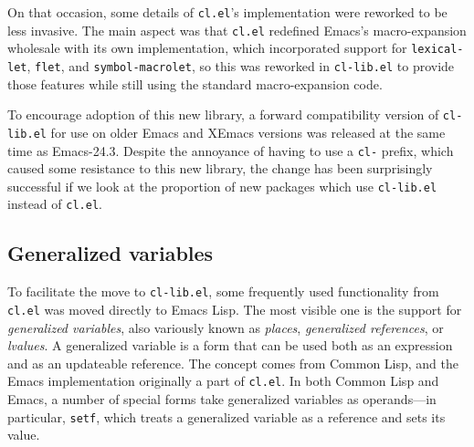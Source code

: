 \documentclass[format=acmsmall, review]{acmart}
\newcommand \Elisp {Emacs Lisp}
\begin{document}
On that occasion, some details of \texttt{cl.el}'s implementation were
reworked to be less invasive.  The main aspect was that \texttt{cl.el}
redefined Emacs's macro-expansion wholesale with its own implementation,
which incorporated support for \texttt{lexical-let}, \texttt{flet}, and
\texttt{symbol-macrolet}, so this was reworked in \texttt{cl-lib.el} to
provide those features while still using the standard macro-expansion code.

To encourage adoption of this new library, a forward compatibility version
of \texttt{cl-lib.el} for use on older Emacs and XEmacs versions was
released at the same time as Emacs-24.3.  Despite the annoyance of having to
use a \texttt{cl-} prefix, which caused some resistance to this new library,
the change has been surprisingly successful if we look at the proportion of
new packages which use \texttt{cl-lib.el} instead of \texttt{cl.el}.

\subsection{Generalized variables} %
\label{sec:generalized-variables}

To facilitate the move to \texttt{cl-lib.el}, some frequently used
functionality from \texttt{cl.el} was moved directly to \Elisp{}.  The
most visible one is the support for \emph{generalized variables}, also
variously known as \emph{places}, \emph{generalized references}, or
\emph{lvalues}.  A generalized variable is a form that can be used both as
an expression and as an updateable reference.  The concept comes from
Common Lisp, and the Emacs implementation originally a part of
\texttt{cl.el}.  In both Common Lisp and Emacs, a number of special
forms take generalized variables as operands---in particular,
\texttt{setf}, which treats a generalized variable as a reference and
sets its value.
\end{document}
